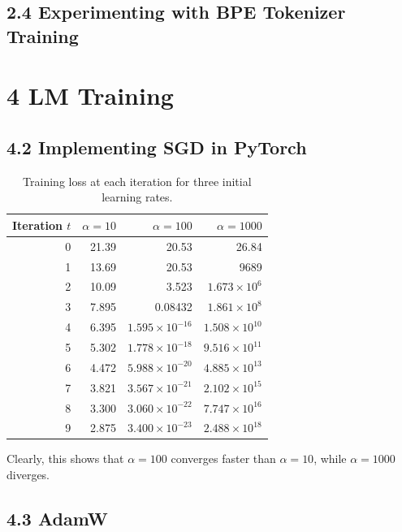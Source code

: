 \documentclass{article}
\begin{document}
\subsection*{2.4 Experimenting with BPE Tokenizer Training}

\section*{4 LM Training}

\subsection*{4.2 Implementing SGD in PyTorch}

\begin{table}[htbp]
  \centering
  \small
  \caption{Training loss at each iteration for three initial learning rates.}
  \label{tab:sgd-learning-rates}
  \begin{tabular}{@{}rrrr@{}}
    \toprule
    Iteration $t$ & $\alpha = 10$ & $\alpha = 100$ & $\alpha = 1000$ \\
    \midrule
    0 & 21.39 & 20.53 & 26.84 \\
    1 & 13.69 & 20.53 & 9689 \\
    2 & 10.09 & 3.523 & $1.673 \times 10^{6}$ \\
    3 & 7.895 & 0.08432 & $1.861 \times 10^{8}$ \\
    4 & 6.395 & $1.595 \times 10^{-16}$ & $1.508 \times 10^{10}$ \\
    5 & 5.302 & $1.778 \times 10^{-18}$ & $9.516 \times 10^{11}$ \\
    6 & 4.472 & $5.988 \times 10^{-20}$ & $4.885 \times 10^{13}$ \\
    7 & 3.821 & $3.567 \times 10^{-21}$ & $2.102 \times 10^{15}$ \\
    8 & 3.300 & $3.060 \times 10^{-22}$ & $7.747 \times 10^{16}$ \\
    9 & 2.875 & $3.400 \times 10^{-23}$ & $2.488 \times 10^{18}$ \\
    \bottomrule
  \end{tabular}
\end{table}

Clearly, this shows that $\alpha=100$ converges faster than $\alpha=10$, while $\alpha=1000$ diverges.

\clearpage
\subsection*{4.3 AdamW}
\end{document}
